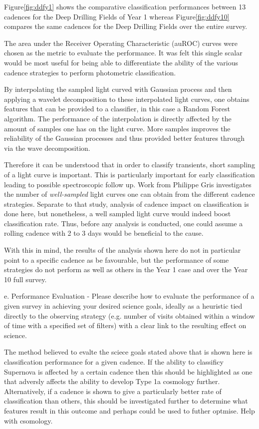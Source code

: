 Figure\ref{fig:ddfy1} shows the
comparative classification performances between 13 cadences for the Deep
Drilling Fields of Year 1 whereas Figure\ref{fig:ddfy10} compares the same
cadences for the Deep Drilling Fields over the entire survey.

The area under
the Receiver Operating Characteristic (auROC) curves were chosen as the metric
to evaluate the performance. It was felt this single scalar would be most useful
for being able to differentiate the ability of the various cadence strategies
to perform photometric classification.

By interpolating the sampled light curved with Gaussian process and then applying a
wavelet decomposition to these interpolated light curves, one obtains features
that can be provided to a classifier, in this case a Random Forest algorithm.
The performance of the interpolation is directly affected by the amount of
samples one has on the light curve. More samples improves the reliability of the
Gaussian processes and thus provided better features through via the wave decomposition.

Therefore it can be understood that in order to classify transients, short sampling of a light
curve is important. This is particularly important for early classification
leading to possible spectroscopic follow up. Work from Philippe Gris
investigates
the number of \emph{well-sampled} light curves one can obtain from the different
cadence strategies. Separate to that study, analysis of cadence impact on
classification is done here, but nonetheless, a well sampled light curve would
indeed boost classification rate. Thus, before any analysis is conducted, one
could assume a rolling cadence with 2 to 3 days would be beneficial to the
cause.

With this in mind, the results of the analysis shown here do not in particular
point to a specific cadence as be favourable, but the performance of some
strategies do not perform as well as others in the Year 1 case and over the
Year 10 full survey.

e. Performance Evaluation - Please describe how to evaluate the performance of a
given survey in achieving your desired science goals, ideally as a heuristic
tied directly to the observing strategy (e.g. number of visits obtained within a
window of time with a specified set of filters) with a clear link to the
resulting effect on science.

The method believed to evalte the sciece goals stated above that is shown here
is classification performance for a given cadence. If the ability to classificy
Supernova is affected by a certain cadence then this should be highlighted as
one that adversly affects the ability to develop Type 1a cosmology further.
Alternatively, if a cadence is shown to give a particularly better rate of
classification than others, this should be investigated further to determine
what features result in this outcome and perhaps could be used to futher
optmise. Help with csomology.

